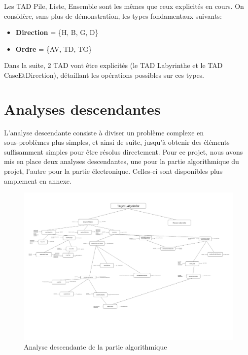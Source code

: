 Les TAD Pile, Liste, Ensemble sont les mêmes que ceux explicités en cours. On considère, sans plus de démonstration, les types fondamentaux suivants:

\begin{itemize}
    \item \textbf{Direction} = \{H, B, G, D\}
    \item \textbf{Ordre} = \{AV, TD, TG\}
\end{itemize}
\vspace{5mm}
Dans la suite, 2 TAD vont être explicités (le TAD Labyrinthe et le TAD CaseEtDirection), détaillant les opérations possibles sur ces types.

 
 

\section{Analyses descendantes}
L'analyse descendante consiste à diviser un problème complexe en\\ sous-problèmes plus simples, et ainsi de suite, jusqu'à obtenir des éléments\\ suffisamment simples pour être résolus directement.
Pour ce projet, nous avons mis en place deux analyses descendantes, une pour la partie algorithmique du projet, l'autre pour la partie électronique. Celles-ci sont disponibles plus amplement en annexe.
\vspace{0.10cm}

\begin{figure}[htbp]
    \centering
    \includegraphics[width=1.2\textwidth]{algo/analyse/analyseDescendante_Algo.pdf} 
    \caption{Analyse descendante de la partie algorithmique}
    \label{fig:analyse}
\end{figure}



